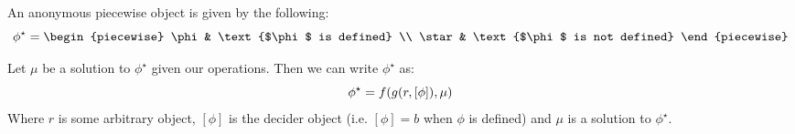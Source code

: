 \begin{theorem}
    An anonymous piecewise object is given by the following:
    $$
        \phi^\star = \begin{piecewise}
            \phi & \text{$\phi$ is defined} \\
            \star & \text{$\phi$ is not defined}
        \end{piecewise}
    $$

    Let $\mu$ be a solution to $\phi^\star$ given our operations. Then we can write $\phi^\star$ as:
    $$
        \phi^\star = f\paren*{g\paren*{r,[\phi]},\mu}
    $$
    Where $r$ is some arbitrary object, $[\phi]$ is the decider object (i.e. $[\phi]=b$ when $\phi$ is defined) and $\mu$ is a solution to $\phi^\star$.
\end{theorem}

\newpage